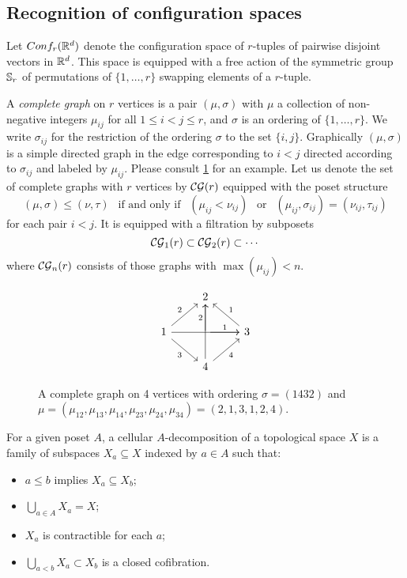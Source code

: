 \subsection{Recognition of configuration spaces}\label{ss:recognition}

Let $Conf_{r}(\mathbb{R}^{d})$ denote the configuration space of $r$-tuples of pairwise disjoint vectors in $\mathbb{R}^{d}$.
This space is equipped with a free action of the symmetric group $\mathbb{S}_r$ of permutations of $\{1,\dots,r\}$ swapping elements of a $r$-tuple.

\begin{definition}
	A \textit{complete graph} on $r$ vertices is a pair $(\mu,\sigma)$ with $\mu$ a collection of non-negative integers $\mu_{ij}$ for all $1 \leq i < j \leq r$, and $\sigma$ is an ordering of $\{1,\dots,r\}$.
	We write $\sigma_{ij}$ for the restriction of the ordering $\sigma$ to the set $\{i,j\}$.
	Graphically $(\mu,\sigma)$ is a simple directed graph in the edge corresponding to $i<j$ directed according to $\sigma_{ij}$ and labeled by $\mu_{ij}$.
	Please consult \cref{f:complete graph} for an example.
	Let us denote the set of complete graphs with $r$ vertices by $\mathcal{CG}(r)$ equipped with the poset structure
	\begin{equation*}
		(\mu,\sigma)\le (\nu,\tau) \ \ \text{ if and only if } \ \
		(\mu_{ij}<\nu_{ij}) \ \ \text{ or } \ \
		(\mu_{ij},\sigma_{ij})= (\nu_{ij},\tau_{ij})
	\end{equation*}
	for each pair $i<j$.
	It is equipped with a filtration by subposets
	\[
	\mathcal{CG}_1(r) \subset \mathcal{CG}_2(r) \subset \dotsb
	\]
	where $\mathcal{CG}_n(r)$ consists of those graphs with $\max(\mu_{ij})< n$.
\end{definition}

\begin{figure}
	\centering
	\begin{equation*}
		\begin{tikzcd}
			\ & 2 & \ \\
			1 \arrow[ur,"2"] \arrow[rr] \arrow[dr,"3"']& \arrow[r,"1"] \arrow[u,"2"] & 3 \arrow[ul,"1"'] \\
			\ & 4 \arrow[ur,"4"'] \arrow[uu] & \
		\end{tikzcd}
	\end{equation*}
	\caption{A complete graph on 4 vertices with ordering $\sigma=(1432)$ and $\mu=(\mu_{12},\mu_{13},\mu_{14},\mu_{23},\mu_{24},\mu_{34})=(2,1,3,1,2,4)$.}
	\label{f:complete graph}
\end{figure}

\begin{definition}
	For a given poset $A$, a cellular $A$-decomposition of a topological space $X$ is a family of subspaces $X_a \subseteq X$ indexed by $a \in A$ such that:
	\begin{itemize}
		\item $a \leq b$ implies $X_a \subseteq X_b$;
		\item $\bigcup_{a \in A} X_a = X$;
		\item $X_a$ is contractible for each $a$;
		\item $\bigcup_{a<b} X_a \subset X_b$ is a closed cofibration.
	\end{itemize}
\end{definition}

